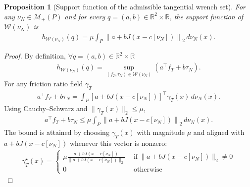 \documentclass[11pt,a4paper]{article}
\theoremstyle{proposition}
\newtheorem{proposition}[theorem]{Proposition}
\newcommand{\R}{\mathbb{R}}
\begin{document}
\begin{proposition}[Support function of the admissible tangential wrench set]
    \label{prop:support}
    For any $\nu_N\in\mathcal M_+(P)$ and for every $q=(a,b)\in\mathbb R^2\times\mathbb R$, the support function of $\mathcal W(\nu_N)$ is
    \begin{align}
    h_{\mathcal W(\nu_N)}(q) = \mu \int_P \left\|a+bJ(x-c[\nu_N])\right\|_2\,d\nu_N(x).
    \end{align}
\end{proposition}
\begin{proof}
    By definition, $\forall q=(a,b)\in\R^2\times \R$
    \begin{align}
    h_{\mathcal W(\nu_N)}(q) =\sup_{(f_T,\tau_N)\in\mathcal W(\nu_N)}\left(a^\top f_T+b\tau_N\right).
    \end{align}
    For any friction ratio field $\gamma_T$
    \begin{align}
    a^\top f_T+b\tau_N=\int_P\left[a+bJ(x-c[\nu_N])\right]^\top\gamma_T(x)\,d\nu_N(x).
    \end{align}
    Using Cauchy--Schwarz and
    $\|\gamma_T(x)\|_2\le\mu$,
    \begin{align}
    a^\top f_T+b\tau_N\le\mu\int_P\left\|a+bJ(x-c[\nu_N])\right\|_2\,d\nu_N(x).
    \end{align}
    The bound is attained by choosing $\gamma_T(x)$ with magnitude $\mu$ and aligned with
    $a+bJ(x-c[\nu_N])$ whenever this vector is nonzero:
    \begin{align}
        \gamma_T^{\star}(x)= \begin{cases}
                \mu\frac{a + bJ(x-c[\nu_N])}{\|a + bJ(x-c[\nu_N])\|_2}~~&\text{if}~\|a + bJ(x-c[\nu_N])\|_2\neq 0\\
                0~~&\text{otherwise}
        \end{cases} 
    \end{align}
\end{proof}
\end{document}
